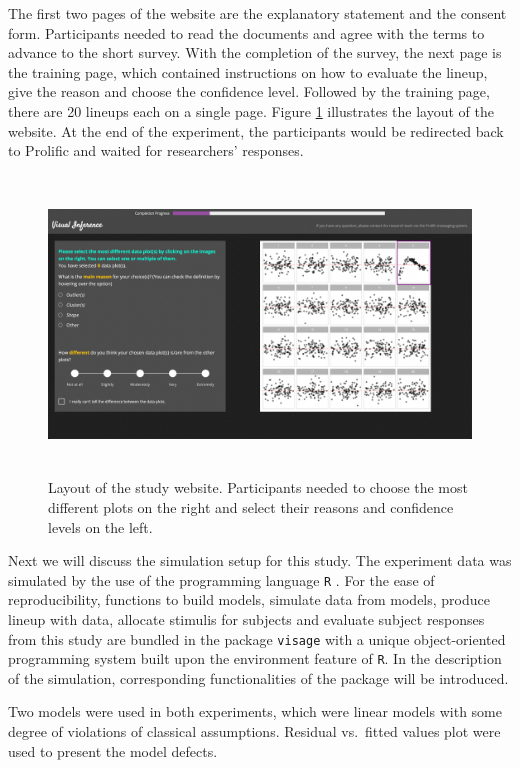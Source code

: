 \documentclass{monashthesis}
\begin{document}
The first two pages of the website are the explanatory statement and the consent form. Participants needed to read the documents and agree with the terms to advance to the short survey. With the completion of the survey, the next page is the training page, which contained instructions on how to evaluate the lineup, give the reason and choose the confidence level. Followed by the training page, there are 20 lineups each on a single page. Figure \ref{fig:WebsiteLayout} illustrates the layout of the website. At the end of the experiment, the participants would be redirected back to Prolific and waited for researchers' responses.

\begin{figure}
\centering
\includegraphics[width=5.72917in,height=3.11458in]{figures/website.png}
\caption{Layout of the study website. Participants needed to choose the most different plots on the right and select their reasons and confidence levels on the left. \label{fig:WebsiteLayout}}
\end{figure}

Next we will discuss the simulation setup for this study. The experiment data was simulated by the use of the programming language \texttt{R} \autocite{r_core_team_r_2021}. For the ease of reproducibility, functions to build models, simulate data from models, produce lineup with data, allocate stimulis for subjects and evaluate subject responses from this study are bundled in the package \texttt{visage} with a unique object-oriented programming system built upon the environment feature of \texttt{R}. In the description of the simulation, corresponding functionalities of the package will be introduced.

Two models were used in both experiments, which were linear models with some degree of violations of classical assumptions. Residual vs.~fitted values plot were used to present the model defects.
\end{document}
